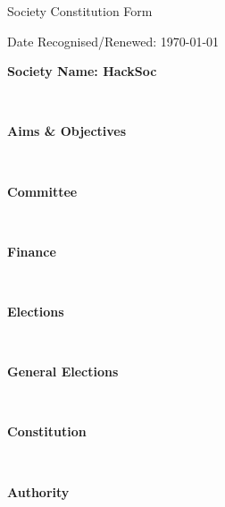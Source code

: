 \documentclass[a4paper,twoside,notitlepage,11pt]{article}
\newcommand{\paperTitle}{Society Constitution Form}
\newcommand{\consHead}[1]{\begin{Large}\textbf{#1}\end{Large}\ \\}
\begin{document}
\thispagestyle{empty}

\begin{center}
	\begin{LARGE}
		\paperTitle \\
	\end{LARGE}
\end{center}
\begin{flushright}
Date Recognised/Renewed: \today \\
\end{flushright}


\noindent
\consHead{Society Name: HackSoc}
\consHead{Aims \& Objectives}
\consHead{Committee}
\consHead{Finance}
\consHead{Elections}
\consHead{General Elections}
\consHead{Constitution}
\consHead{Authority}
\end{document}
